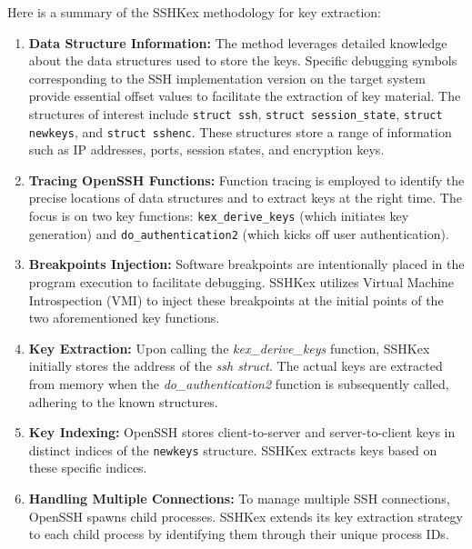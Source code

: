     Here is a summary of the SSHKex methodology for key extraction:
    \begin{enumerate}
        \item \textbf{Data Structure Information:} The method leverages detailed knowledge about the data structures used to store the keys. Specific debugging symbols corresponding to the SSH implementation version on the target system provide essential offset values to facilitate the extraction of key material. The structures of interest include \texttt{struct ssh}, \texttt{struct session\_state}, \texttt{struct newkeys}, and \texttt{struct sshenc}. These structures store a range of information such as IP addresses, ports, session states, and encryption keys.

        \item \textbf{Tracing OpenSSH Functions:} Function tracing is employed to identify the precise locations of data structures and to extract keys at the right time. The focus is on two key functions: \texttt{kex\_derive\_keys} (which initiates key generation) and \texttt{do\_authentication2} (which kicks off user authentication).

        \item \textbf{Breakpoints Injection:} Software breakpoints are intentionally placed in the program execution to facilitate debugging. SSHKex utilizes Virtual Machine Introspection (VMI) to inject these breakpoints at the initial points of the two aforementioned key functions.

        \item \textbf{Key Extraction:} Upon calling the \textit{kex\_derive\_keys} function, SSHKex initially stores the address of the \textit{ssh struct}. The actual keys are extracted from memory when the \textit{do\_authentication2} function is subsequently called, adhering to the known structures. 

        \item \textbf{Key Indexing:} OpenSSH stores client-to-server and server-to-client keys in distinct indices of the \texttt{newkeys} structure. SSHKex extracts keys based on these specific indices.

        \item \textbf{Handling Multiple Connections:} To manage multiple SSH connections, OpenSSH spawns child processes. SSHKex extends its key extraction strategy to each child process by identifying them through their unique process IDs.
    \end{enumerate}
    
